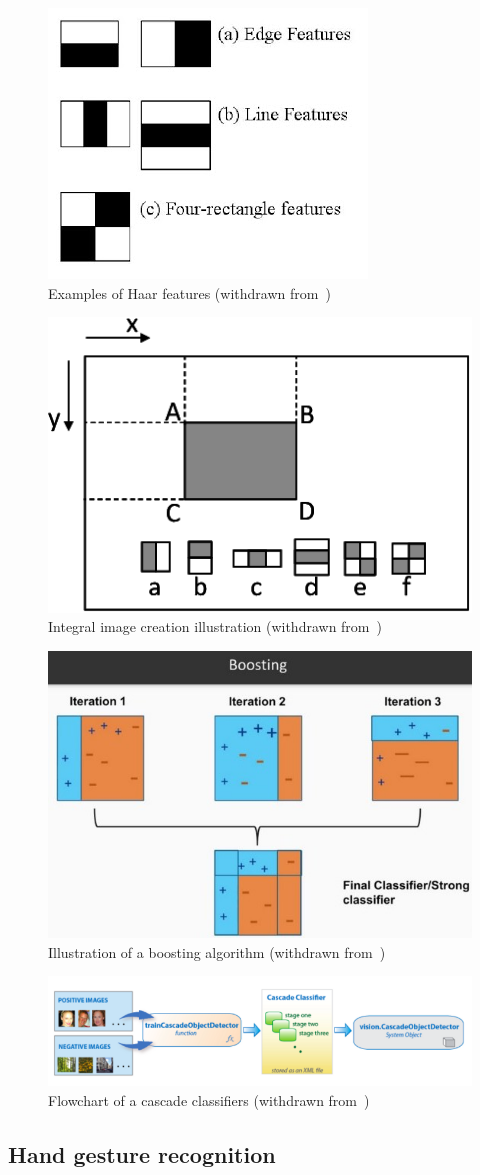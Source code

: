 %
\begin{figure}[htb!]
\centering
    \includegraphics[width=0.4\columnwidth]{./img/haar-features.jpg}
  \caption{Examples of Haar features (withdrawn from~\cite{opencv-haar-classif})}%
\label{fig:haar-features}
\end{figure}
%
\begin{figure}[htb!]
\centering
    \includegraphics[width=0.4\columnwidth]{./img/haar-integral.png}
  \caption{Integral image creation illustration (withdrawn from~\cite{haar-classif-explained})}%
\label{fig:haar-integral}
\end{figure}
%
\begin{figure}[htb!]
\centering
    \includegraphics[width=0.6\columnwidth]{./img/boosting.jpeg}
  \caption{Illustration of a boosting algorithm (withdrawn from~\cite{haar-classif-explained})}%
\label{fig:boosting}
\end{figure}
%
\begin{figure}[htb!]
\centering
    \includegraphics[width=1.0\columnwidth]{./img/cascade-implem.png}
  \caption{Flowchart of a cascade classifiers (withdrawn from~\cite{haar-classif-explained})}%
\label{fig:cascade-implem}
\end{figure}
%
\subsection{Hand gesture recognition}
\label{sec:hand-gest-recogn}


